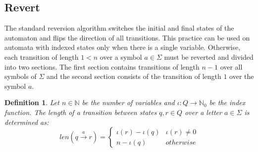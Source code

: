 \documentclass[pdflatex,sn-mathphys-num]{sn-jnl}%
\theoremstyle{thmstyleone}%
\theoremstyle{thmstyletwo}%
\theoremstyle{thmstylethree}%
\newtheorem{definition}{Definition}%
\begin{document}
    \subsection{Revert}
        The standard reversion algorithm switches the initial and final states of the automaton and flips the direction of all transitions. This practice can be used on automata with indexed states only when there is a single variable. Otherwise, each transition of length $1 < n$ over a symbol $a \in \Sigma$ must be reverted and divided into two sections. The first section contains transitions of length $n - 1$ over all symbols of $\Sigma$ and the second section consists of the transition of length $1$ over the symbol $a$.

        \vspace*{0.5em}

        \begin{definition}
            Let $n \in \mathbb{N}$ be the number of variables and $\iota : Q \rightarrow \mathbb{N}_0$ be the index function. The length of a transition between states $q, r \in Q$ over a letter $a \in \Sigma$ is determined as:
            $$
            len(q \xrightarrow[]{a} r) =
            \begin{cases}
                \iota(r) - \iota(q) & \iota(r) \neq 0\\
                n - \iota(q) & otherwise
            \end{cases}
            $$
        \end{definition}

        \vspace*{0.5em}
\end{document}

